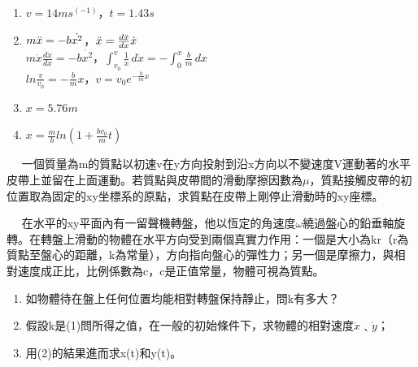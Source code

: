 \documentclass[cn,10pt,math=newtx,chinesefont=founder]{../elegantbook}
\begin{document}
\begin{solution}
\begin{enumerate}[label=(\arabic*)]
\item $v = 14ms^(-1)$，$t = 1.43s$
\item $m\Ddot{x} = -b\Dot{x^2}$，$\Ddot{x} = \frac{d\Ddot{x}}{dx}\Dot{x}$\\
$m\Dot{x}\frac{d\Dot{x}}{dx} = -b\Dot{x^2}$，$\int_{v_0}^{v} \frac{1}{\Dot{x}}\, d\Dot{x} = -\int_{0}^{x} \frac{b}{m}\, dx$\\
$ln\frac{v}{v_0} = -\frac{b}{m}x$，$v = v_0e^{-\frac{b}{m}x}$
\item $x = 5.76m$
\item $x = \frac{m}{b}ln(1+\frac{bv_0}{m}t)$
\end{enumerate}
\end{solution}

\newpage


\begin{example}　
    一個質量為m的質點以初速v在y方向投射到沿x方向以不變速度V運動著的水平皮帶上並留在上面運動。若質點與皮帶間的滑動摩擦因數為$\mu$，質點接觸皮帶的初位置取為固定的xy坐標系的原點，求質點在皮帶上剛停止滑動時的xy座標。
    
    \rightline{[2.1.30]}
    
\end{example}

\begin{solution}

\end{solution}

\newpage


\begin{example}　
    在水平的xy平面內有一留聲機轉盤，他以恆定的角速度$\omega$繞過盤心的鉛垂軸旋轉。在轉盤上滑動的物體在水平方向受到兩個真實力作用：一個是大小為kr（r為質點至盤心的距離，k為常量），方向指向盤心的彈性力；另一個是摩擦力，與相對速度成正比，比例係數為c，c是正值常量，物體可視為質點。
    \begin{enumerate}[label=(\arabic*)]
    \item 如物體待在盤上任何位置均能相對轉盤保持靜止，問k有多大？
    \item 假設k是(1)問所得之值，在一般的初始條件下，求物體的相對速度$\Dot{x}$﹑$\Dot{y}$；
    \item 用(2)的結果進而求x(t)和y(t)。
    \end{enumerate}
    
    \rightline{[2.1.31]}
    
\end{example}
\end{document}
